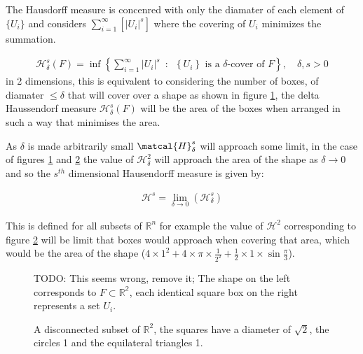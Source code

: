 \documentclass[11pt]{article}
\begin{document}
The Hausdorff measure is concenred with only the diamater of each element of \(\{U_{i}\}\) and considers \(\sum^{\infty}_{i=1} \left[\left\lvert U_{i}\right\rvert^{s}\right]\) where the covering of \(U_{i}\) minimizes the summation.  \cite[p. 27]{falconerFractalGeometryMathematical2003b}

\begin{align}
\mathcal{H}^s_{\delta}\left( F \right)= \inf \left\{ \sum^{\infty}_{i= 1}   \left\lvert U_i \right\rvert^s \enspace : \enspace  \left\{U_i\right\} \text{ is a } \delta \text{-cover of } F \right\}, \quad \delta, s > 0 \label{eq:delta-measure}
\end{align}
in 2 dimensions, this is equivalent to considering the number of boxes, of
diamater \(\leq \delta\) that will cover over a shape as shown in figure
\ref{hausdorff-covering}, the delta Haussendorf measure
\(\mathcal{H}^{s}_{\delta} \left(F\right)\) will be the area of the boxes when
arranged in such a way that minimises the area.

As \(\delta\) is made arbitrarily small \(\matcal{H}_{\delta}^{s}\) will approach some limit, in the case of figures \ref{hausdorff-covering}  and \ref{abstract-shape} the value of \(\mathcal{H}^{2}_{\delta}\) will approach the area of the shape as \(\delta \rightarrow 0\) and so the \(s^{th}\) dimensional Hausendorff measure is given by:

\begin{align}
\mathcal{H}^{s} = \lim_{\delta \rightarrow 0}\left( \mathcal{H}^{s}_{\delta} \right)
\end{align}

This is defined for all subsets of \(\mathbb{R}^n\) for example the value of  \(\mathcal{H}^{2}\) corresponding to figure \ref{abstract-shape} will be limit that boxes would approach when covering that area, which would be the area of the shape (\(4\times 1^2 + 4\times \pi\times \frac{1}{2^2} + \frac{1}{2}\times 1 \times \sin{\frac{\pi}{3}}\)).



\begin{figure}[htbp]
\centering

\caption{\label{hausdorff-covering}TODO: This seems wrong, remove it; The shape on the left corresponds to \(F \subset \mathbb{R^{2}}\), each identical square box on the right represents a set \(U_{i}\).}
\end{figure}



\begin{figure}[htbp]
\centering

\caption{\label{abstract-shape}A disconnected subset of \(\mathbb{R}^{2}\), the squares have a diameter of \(\sqrt{2}\), the circles 1 and the equilateral triangles 1.}
\end{figure}
\end{document}
